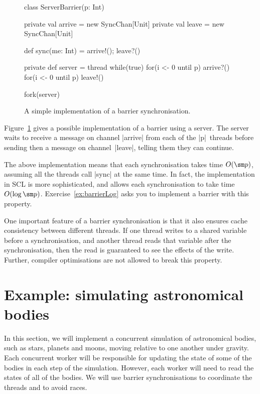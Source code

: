 
\begin{figure}
\begin{scala}
class ServerBarrier(p: Int){
  private val arrive = new SyncChan[Unit]
  private val leave = new SyncChan[Unit]

  def sync(me: Int) = { arrive!(); leave?() }

  private def server = thread{
    while(true){
      for(i <- 0 until p) arrive?()
      for(i <- 0 until p) leave!()
    }
  }

  fork(server)
}
\end{scala}
\caption{A simple implementation of a barrier synchronisation.}
\label{fig:serverBarrier}
\end{figure}

Figure~\ref{fig:serverBarrier} gives a possible implementation of a barrier
using a server.  The server waits to receive a message on channel |arrive|
from each of the |p|~threads before sending then a message on channel~|leave|,
telling them they can continue.

The above implementation means that each synchronisation takes time $O(\sm p)$,
assuming all the threads call |sync| at the same time.  In fact, the
implementation in SCL is more sophisticated, and allows each synchronisation
to take time $O(\log \sm p)$.  Exercise~\ref{ex:barrierLog} asks you to
implement a barrier with this property.

One important feature of a barrier synchronisation is that it also ensures
cache consistency between different threads.  If one thread writes to a shared
variable before a synchronisation, and another thread reads that variable
after the synchronisation, then the read is guaranteed to see the effects of
the write.  Further, compiler optimisations are not allowed to break this
property.  


\section{Example: simulating astronomical bodies}

In this section, we will implement a concurrent simulation of astronomical
bodies, such as stars, planets and moons, moving relative to one another under
gravity.  Each concurrent worker will be responsible for updating the state of
some of the bodies in each step of the simulation.  However, each worker will
need to read the states of all of the bodies.  We will use barrier
synchronisations to coordinate the threads and to avoid races.

